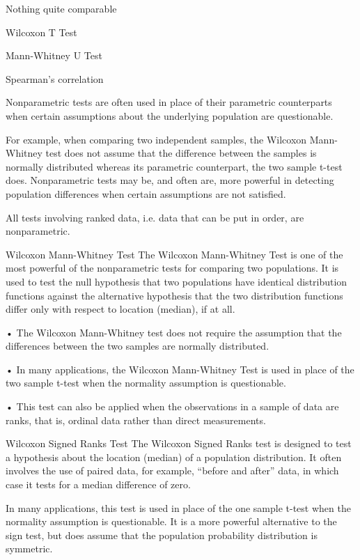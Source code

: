 	Nothing quite comparable 

Wilcoxon T Test 

Mann-Whitney U Test 

Spearman's correlation 
 
 




 

Nonparametric tests are often used in place of their parametric counterparts when certain assumptions about the underlying population are questionable. 

For example, when comparing two independent samples, the Wilcoxon Mann-Whitney test does not assume that the difference between the samples is normally distributed whereas its parametric counterpart, the two sample t-test does. Nonparametric tests may be, and often are, more powerful in detecting population differences when certain assumptions are not satisfied.

All tests involving ranked data, i.e. data that can be put in order, are nonparametric.

 Wilcoxon Mann-Whitney Test
The Wilcoxon Mann-Whitney Test is one of the most powerful of the nonparametric tests for comparing two populations. It is used to test the null hypothesis that two populations have identical distribution functions against the alternative hypothesis that the two distribution functions differ only with respect to location (median), if at all.

•	The Wilcoxon Mann-Whitney test does not require the assumption that the differences between the two samples are normally distributed.

•	In many applications, the Wilcoxon Mann-Whitney Test is used in place of the two sample t-test when the normality assumption is questionable.

•	This test can also be applied when the observations in a sample of data are ranks, that is, ordinal data rather than direct measurements.

 Wilcoxon Signed Ranks Test
The Wilcoxon Signed Ranks test is designed to test a hypothesis about the location (median) of a population distribution. It often involves the use of paired data, for example, “before and after” data, in which case it tests for a median difference of zero.

In many applications, this test is used in place of the one sample t-test when the normality assumption is questionable. It is a more powerful alternative to the sign test, but does assume that the population probability distribution is symmetric.

